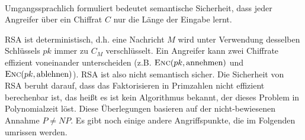 ~\\
Umgangssprachlich formuliert bedeutet semantische Sicherheit, dass jeder Angreifer über ein Chiffrat $C$ nur die Länge der Eingabe lernt.

RSA ist deterministisch, d.h. eine Nachricht $M$ wird unter Verwendung desselben Schlüssels $pk$ immer zu $C_M$ verschlüsselt. Ein Angreifer kann zwei Chiffrate effizient voneinander unterscheiden (z.B. $\textsc{Enc}(pk, \text{annehmen})$ und $\textsc{Enc}(pk, \text{ablehnen})$). RSA ist also nicht semantisch sicher. Die Sicherheit von RSA beruht darauf, dass das Faktorisieren in Primzahlen nicht effizient berechenbar ist, das heißt es ist kein Algorithmus bekannt, der dieses Problem in Polynomialzeit löst. Diese Überlegungen basieren auf der nicht-bewiesenen Annahme $P \neq NP$.
Es gibt noch einige andere Angriffspunkte, die im Folgenden umrissen werden.

